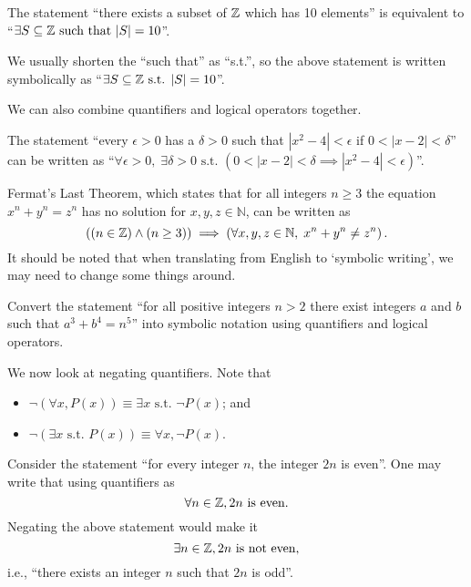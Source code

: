 \begin{example}
    The statement ``there exists a subset of $\mathbb{Z}$ which has 10 elements'' is equivalent to ``$\exists S \subseteq \mathbb{Z} \text{ such that } |S| = 10$''.
\end{example}
\begin{remark}
    We usually shorten the ``such that'' as ``s.t.'', so the above statement is written symbolically as ``$\exists S \subseteq \mathbb{Z} \text{ s.t. } |S| = 10$''.
\end{remark}

We can also combine quantifiers and logical operators together.
\begin{example}
    The statement ``every $\epsilon > 0$ has a $\delta > 0$ such that $|x^2 - 4| < \epsilon$ if $0 < |x - 2| < \delta$'' can be written as ``$\forall \epsilon > 0,\;\exists \delta > 0 \text{ s.t. } (0 < |x - 2| < \delta \implies |x^2 - 4| < \epsilon)$''.
\end{example}

\begin{example}
    Fermat's Last Theorem, which states that for all integers $n\geq 3$ the equation $x^n + y^n = z^n$ has no solution for $x, y, z \in \mathbb{N}$, can be written as
    \[
        \left((n \in \mathbb{Z}) \land (n \geq 3)\right) \implies \left(\forall x, y, z \in \mathbb{N},\; x^n + y^n \neq z^n\right).
    \]
    It should be noted that when translating from English to `symbolic writing', we may need to change some things around.
\end{example}

\begin{exercise}
    Convert the statement ``for all positive integers $n > 2$ there exist integers $a$ and $b$ such that $a^3 + b^4 = n^5$'' into symbolic notation using quantifiers and logical operators.
\end{exercise}

\newpage

We now look at negating quantifiers. Note that
\begin{itemize}
    \item $\lnot(\forall x, P(x)) \equiv \exists x \text{ s.t. } \lnot P(x)$; and
    \item $\lnot(\exists x \text{ s.t. } P(x)) \equiv \forall x, \lnot P(x)$.
\end{itemize}

\begin{example}
    Consider the statement ``for every integer $n$, the integer $2n$ is even''. One may write that using quantifiers as
    \[
        \forall n \in\mathbb{Z}, 2n \text{ is even}.
    \]
    Negating the above statement would make it
    \[
        \exists n \in \mathbb{Z}, 2n \text{ is not even},
    \]
    i.e., ``there exists an integer $n$ such that $2n$ is odd''.
\end{example}

